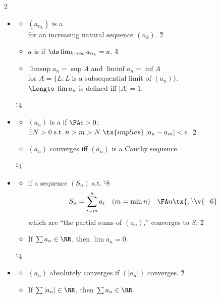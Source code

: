 \documentclass[dvipdfmx,a4paper,titlepage,9pt]{jsarticle}
\begin{document}
\begin{multicols*}{2}
\begin{itemize}[label={-}]
\;\v{-4}

\item{}
\begin{itemize}[label={$\cdot$}]
\setlength{\leftskip}{-10pt}
\item $(a_{n_k})$ is a  \\
               for an increasing natural sequence $(n_k)$. \v2
\item $a$ is  if $\ds\lim_{k\to\infty} a_{n_k}=a$. \v4
\item $\limsup a_n=\sup A$ and $\liminf a_n=\inf A$ \\
               for $A=\{L:L\;\text{is a subsequential limit of $(a_n)$}\}$. \\
               $\Longto\;\lim a_n$ is defined iff $|A|=1$.
\end{itemize}

\; \v{-4}

\item{}
\begin{itemize}[label={$\cdot$}]
\setlength{\leftskip}{-10pt}
\item $(a_n)$ is a  if $\FA\epsilon>0$; \\
$\exists N>0\;\text{s.t.}\;n>m>N\;\tx{implies}\;|a_n-a_m|<\epsilon.$ \v2

\item$(a_n)$ converges iff $(a_n)$ is a Cauchy sequence.
\end{itemize}

\; \v{-4}

\item{}
\begin{itemize}[label={$\cdot$}]
\setlength{\leftskip}{-10pt}
\item {} if a sequence $(S_n)$ s.t. \v{-8}
$$S_n=\sum_{i=m}^n a_i\quad(m=\min n)\quad\FA n\tx{,}\v{-6}$$
which are ``the partial sums of $(a_n)$,'' converges to $S$. \v2

\item If $\sum a_n\in\RR$, then $\lim a_n=0$. 
\end{itemize}

\; \v{-4}

\item{}
\begin{itemize}[label={$\cdot$}]
\setlength{\leftskip}{-10pt}
\item $(a_n)$ absolutely converges if $(|a_n|)$ converges. \v2
\item If $\sum |a_n|\in\RR$, then $\sum a_n\in\RR$.
\end{itemize}


\end{itemize}
\end{multicols*}
\end{document}
